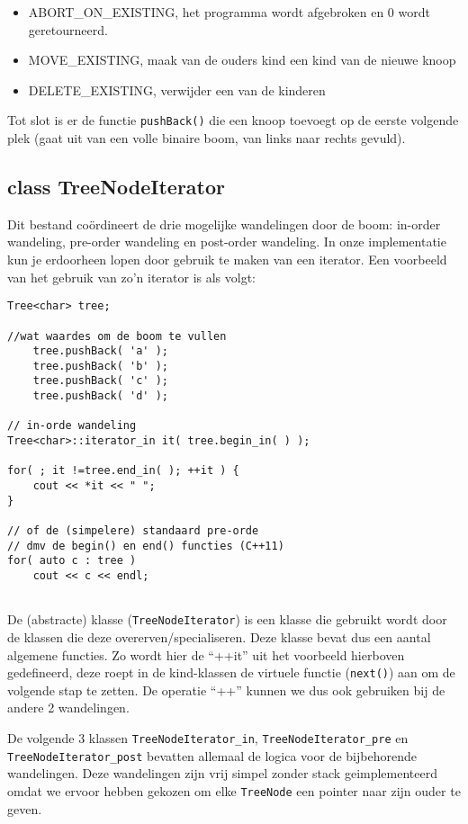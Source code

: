 \documentclass[a4paper,10pt]{article}
\begin{document}
\begin{itemize}
\item ABORT\_ON\_EXISTING, het programma wordt afgebroken en 0 wordt geretourneerd.
\item MOVE\_EXISTING, maak van de ouders kind een kind van de nieuwe knoop
\item DELETE\_EXISTING, verwijder een van de kinderen
\end{itemize}

\noindent Tot slot is er de functie \texttt{pushBack()} die een knoop toevoegt op de eerste volgende plek (gaat uit van een volle binaire boom, van links naar rechts gevuld).

\subsection*{class TreeNodeIterator}
Dit bestand coördineert de drie mogelijke wandelingen door de boom: in-order wandeling, pre-order wandeling en post-order wandeling.
In onze implementatie kun je erdoorheen lopen door gebruik te maken van een iterator.
Een voorbeeld van het gebruik van zo'n iterator is als volgt:
\begin{verbatim}
Tree<char> tree;

//wat waardes om de boom te vullen
    tree.pushBack( 'a' );
    tree.pushBack( 'b' );
    tree.pushBack( 'c' );
    tree.pushBack( 'd' );

// in-orde wandeling
Tree<char>::iterator_in it( tree.begin_in( ) );

for( ; it !=tree.end_in( ); ++it ) {
    cout << *it << " ";
}

// of de (simpelere) standaard pre-orde
// dmv de begin() en end() functies (C++11)
for( auto c : tree )
    cout << c << endl;
    
\end{verbatim}
De (abstracte) klasse (\texttt{TreeNodeIterator}) is een klasse die gebruikt wordt door de klassen die deze overerven/specialiseren.
Deze klasse bevat dus een aantal algemene functies.
Zo wordt hier de ``++it'' uit het voorbeeld hierboven gedefineerd, deze roept in de kind-klassen de virtuele functie (\texttt{next()}) aan om de volgende stap te zetten.
De operatie ``++'' kunnen we dus ook gebruiken bij de andere 2 wandelingen.

De volgende 3 klassen \texttt{TreeNodeIterator\_in}, \texttt{TreeNodeIterator\_pre} en \texttt{TreeNodeIterator\_post} bevatten
allemaal de logica voor de bijbehorende wandelingen. Deze wandelingen zijn vrij simpel zonder stack geimplementeerd omdat we ervoor hebben gekozen om elke \texttt{TreeNode} een pointer naar zijn ouder te geven.
\end{document}
